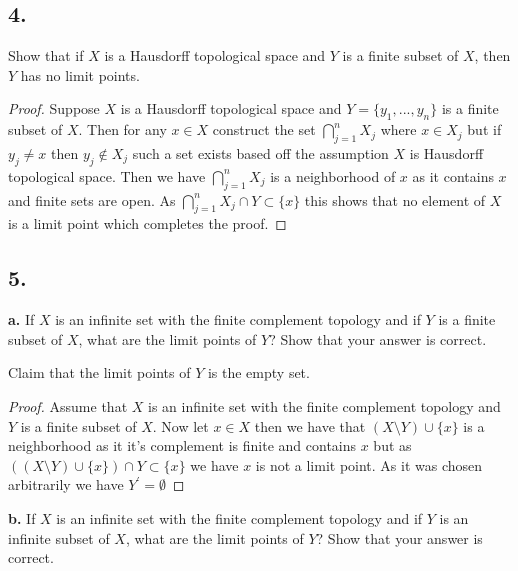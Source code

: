 \documentclass{amsart}
\theoremstyle{plain}
\theoremstyle{definition}
\theoremstyle{remark}
\begin{document}
\vspace{.15in}

\noindent
\subsection*{4.}  Show that if $X$ is a Hausdorff topological space and $Y$ is a finite subset of $X$, then $Y$ has no limit points. 

\begin{proof}
    Suppose $X$ is a Hausdorff topological space and $Y=\{y_1,...,y_n\}$ is a finite subset of $X$. Then for any $x\in X$ construct the set $\bigcap_{j=1}^nX_j$ where $x \in X_j$ but if $y_j\not = x$ then $y_j\not \in X_j$ such a set exists based off the assumption $X$ is Hausdorff topological space. Then we have $\bigcap_{j=1}^nX_j$ is a neighborhood of $x$ as it contains $x$ and finite sets are open. As $\bigcap_{j=1}^nX_j\cap Y\subset \{x\}$ this shows that no element of $X$ is a limit point which completes the proof.
    
\end{proof}



\vspace{.15in}

\noindent
\subsection*{5.} 

{\bfseries a.} If $X$ is an infinite set with the finite complement topology and if $Y$ is a finite subset of $X$, what are the limit points of $Y$? Show that your answer is correct. 

Claim that the limit points of $Y$ is the empty set. 
\begin{proof}
    Assume that $X$ is an infinite set with the finite complement topology and $Y$ is a finite subset of $X$. Now let $x\in X$ then we have that $(X\setminus Y)\cup \{x\}$ is a neighborhood as it it's complement is finite and contains $x$ but as $((X\setminus Y)\cup \{x\})\cap Y\subset \{x\}$ we have $x$ is not a limit point. As it was chosen arbitrarily we have $Y^\prime=\emptyset$  
\end{proof}


\vspace{.1in}
{\bfseries b.} If $X$ is an infinite set with the finite complement topology and if $Y$ is an infinite subset of $X$, what are the limit points of $Y$? Show that your answer is correct. 
\end{document}
